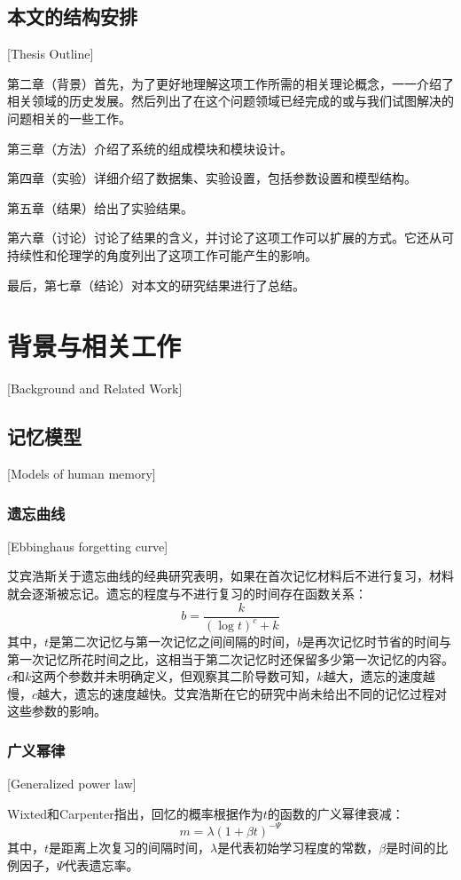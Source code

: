 \section{本文的结构安排}[Thesis Outline]

第二章（背景）首先，为了更好地理解这项工作所需的相关理论概念，一一介绍了相关领域的历史发展。然后列出了在这个问题领域已经完成的或与我们试图解决的问题相关的一些工作。

第三章（方法）介绍了系统的组成模块和模块设计。

第四章（实验）详细介绍了数据集、实验设置，包括参数设置和模型结构。

第五章（结果）给出了实验结果。

第六章（讨论）讨论了结果的含义，并讨论了这项工作可以扩展的方式。它还从可持续性和伦理学的角度列出了这项工作可能产生的影响。

最后，第七章（结论）对本文的研究结果进行了总结。

\chapter{背景与相关工作}[Background and Related Work]

\section{记忆模型}[Models of human memory]

\subsection{遗忘曲线}[Ebbinghaus forgetting curve]

艾宾浩斯关于遗忘曲线的经典研究表明，如果在首次记忆材料后不进行复习，材料就会逐渐被忘记。遗忘的程度与不进行复习的时间存在函数关系：
\begin{equation}
b = \frac{k}{(\log t)^c + k}
\end{equation}
其中，$t$是第二次记忆与第一次记忆之间间隔的时间，$b$是再次记忆时节省的时间与第一次记忆所花时间之比，这相当于第二次记忆时还保留多少第一次记忆的内容。$c$和$k$这两个参数并未明确定义，但观察其二阶导数可知，$k$越大，遗忘的速度越慢，$c$越大，遗忘的速度越快。艾宾浩斯在它的研究中尚未给出不同的记忆过程对这些参数的影响。

\subsection{广义幂律}[Generalized power law]

Wixted和Carpenter指出，回忆的概率根据作为$t$的函数的广义幂律衰减：
\begin{equation}
m=\lambda(1+\beta t)^{-\Psi}
\end{equation}
其中，$t$是距离上次复习的间隔时间，$\lambda$是代表初始学习程度的常数，$\beta$是时间的比例因子，$\Psi$代表遗忘率。

